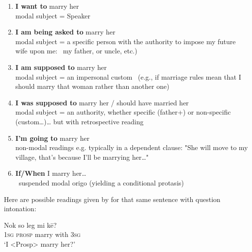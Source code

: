 \documentclass[output=paper]{langsci/langscibook}
\begin{document}
\begin{enumerate}[label=\alph*)]
	\item \textbf{I want to} marry her\\modal subject = Speaker
	\item \textbf{I am being asked to} marry her\\modal subject =  a specific person with the authority to impose my future wife upon me:  my father, 				or uncle, etc.)
	\item \textbf{I am supposed to} marry her\\modal subject = an impersonal custom  (e.g., if marriage rules mean that I should marry that woman rather than another one)
	\item \textbf{I was supposed to} marry her / should have married her\\modal subject = an authority, whether specific (father+) or non-specific (custom…)… but with retrospective reading
	\item \textbf{I'm going to} marry her\\non-modal readings e.g. typically in a dependent clause: "She will move to my village, that's because I'll be marrying her…"
	\item \textbf{If/When} I marry her…\\ suspended modal origo (yielding a conditional protasis)
\end{enumerate}

Here are possible readings given by \citeauthor{Francois2003} for that same sentence with question intonation:

\begin{exe}
	\ex \label{ex:ar16}
	\gll Nok so leg mi kē?\\
	1\textsc{sg} \textsc{prosp} marry with 3\textsc{sg}\\
	\trans ‘I <Prosp> marry her?’
\end{exe}
\end{document}
